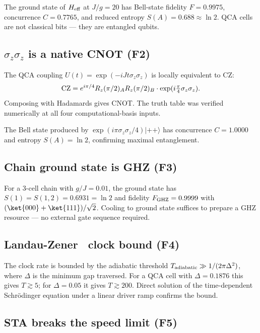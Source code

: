 \documentclass[11pt,aps,prl,twocolumn]{revtex4-2}
\begin{document}
The ground state of $H_{\rm eff}$ at $J/g = 20$ has Bell-state
fidelity $F = 0.9975$, concurrence $C = 0.7765$, and reduced
entropy $S(A) = 0.688 \approx \ln 2$.  QCA cells are not classical
bits — they are entangled qubits.

\subsection{$\sigma_z \sigma_z$ is a native CNOT (F2)}

The QCA coupling $U(t) = \exp(-i J t \sigma_z \sigma_z)$ is
locally equivalent to CZ:
\begin{equation}
{\rm CZ} = e^{i\pi/4} R_z(\pi/2)_A R_z(\pi/2)_B \cdot
\exp(i \tfrac{\pi}{4} \sigma_z \sigma_z).
\end{equation}
Composing with Hadamards gives CNOT.  The truth table was verified
numerically at all four computational-basis inputs.

The Bell state produced by $\exp(i\pi\sigma_z\sigma_z/4)|{+}{+}\rangle$
has concurrence $C = 1.0000$ and entropy $S(A) = \ln 2$, confirming
maximal entanglement.

\subsection{Chain ground state is GHZ (F3)}

For a 3-cell chain with $g/J = 0.01$, the ground state has
$S(1) = S(1,2) = 0.6931 = \ln 2$ and fidelity $F_{\rm GHZ} = 0.9999$
with $(\ket{000} + \ket{111})/\sqrt{2}$.  Cooling to ground state
suffices to prepare a GHZ resource — no external gate sequence
required.

\subsection{Landau-Zener~\cite{landau1932zur,zener1932non} clock bound (F4)}

The clock rate is bounded by the adiabatic threshold
$T_{\rm adiabatic} \gg 1/(2\pi \Delta^2)$, where $\Delta$ is the
minimum gap traversed.  For a QCA cell with $\Delta = 0.1876$ this
gives $T \gtrsim 5$; for $\Delta = 0.05$ it gives $T \gtrsim 200$.
Direct solution of the time-dependent Schrödinger equation under a
linear driver ramp confirms the bound.

\subsection{STA breaks the speed limit (F5)}
\end{document}
